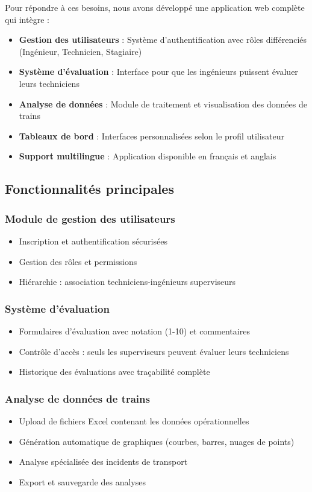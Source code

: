 Pour répondre à ces besoins, nous avons développé une application web complète qui intègre :

\begin{itemize}
    \item \textbf{Gestion des utilisateurs} : Système d'authentification avec rôles différenciés (Ingénieur, Technicien, Stagiaire)
    \item \textbf{Système d'évaluation} : Interface pour que les ingénieurs puissent évaluer leurs techniciens
    \item \textbf{Analyse de données} : Module de traitement et visualisation des données de trains
    \item \textbf{Tableaux de bord} : Interfaces personnalisées selon le profil utilisateur
    \item \textbf{Support multilingue} : Application disponible en français et anglais
\end{itemize}

\subsection{Fonctionnalités principales}

\subsubsection{Module de gestion des utilisateurs}
\begin{itemize}
    \item Inscription et authentification sécurisées
    \item Gestion des rôles et permissions
    \item Hiérarchie : association techniciens-ingénieurs superviseurs
\end{itemize}

\subsubsection{Système d'évaluation}
\begin{itemize}
    \item Formulaires d'évaluation avec notation (1-10) et commentaires
    \item Contrôle d'accès : seuls les superviseurs peuvent évaluer leurs techniciens
    \item Historique des évaluations avec traçabilité complète
\end{itemize}

\subsubsection{Analyse de données de trains}
\begin{itemize}
    \item Upload de fichiers Excel contenant les données opérationnelles
    \item Génération automatique de graphiques (courbes, barres, nuages de points)
    \item Analyse spécialisée des incidents de transport
    \item Export et sauvegarde des analyses
\end{itemize}

